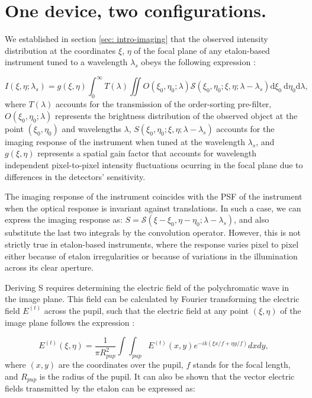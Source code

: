 \section{One device, two configurations.}

We established in section \ref{sec: intro-imaging} that the observed intensity distribution at the coordinates $\xi$, $\eta$ of the focal plane of any etalon-based instrument tuned to a wavelength $\lambda_s$ obeys the following expression \citep{franI}: 

\begin{equation}
    I\left(\xi, \eta ; \lambda_{s}\right)=g(\xi, \eta)\int_{0}^{\infty} T(\lambda) \iint  O\left(\xi_0, \eta_0 ; \lambda\right)  \mathcal{S}\left(\xi_0, \eta_0; \xi , \eta; \lambda-\lambda_{s}\right)  \mathrm{d} \xi_{0} \mathrm{~d} \eta_{0}\mathrm{d} \lambda ,
    \label{eq_etalon_theory: General_Intensity}
\end{equation}
where $T(\lambda)$ accounts for the transmission of the order-sorting pre-filter, $O\left(\xi_0, \eta_0 ; \lambda\right)$ represents the brightness distribution of the observed object at the point $\left(\xi_0, \eta_0\right)$ and wavelengths $\lambda$, $S\left(\xi_0, \eta_0; \xi , \eta; \lambda-\lambda_{s}\right)$ accounts for the imaging response of the instrument when tuned at the wavelength $\lambda_{s}$, and $g(\xi, \eta)$ represents a spatial gain factor that accounts for wavelength independent pixel-to-pixel intensity fluctuations ocurring in the focal plane due to differences in the detectors' sensitivity. 

The imaging response of the instrument coincides with the PSF of the instrument when the optical response is invariant against translations. In such a case, we can express the imaging response as: $S =\mathcal{S}\left(\xi - \xi_0 , \eta - \eta_0; \lambda-\lambda_{s}\right)$, and also substitute the last two integrals by the convolution operator.  However, this is not strictly true in etalon-based instruments, where the response varies pixel to pixel either because of etalon irregularities or because of variations in the illumination across its clear aperture.

Deriving S requires determining the electric field of the polychromatic wave in the image plane. This field can be calculated by Fourier transforming the electric field $E^{(t)}$ across the pupil, such that the electric field at any point $(\xi, \eta)$ of the image plane follows the expression \citep{franI}:

\begin{equation}
  E  ^{(t)}(\xi, \eta) = \frac{1}{\pi R_{pup} ^2} \int \int _ {pup} E^{(t)}(x, y)e ^{-ik( \xi x / f + \eta y / f)}dx dy,
  \label{eq_etalon_theory: electric_image_plane}
\end{equation}
where $(x, y)$ are the coordinates over the pupil, $f$ stands for the focal length, and $R_{pup}$ is the radius of the pupil.  It can also be shown that the vector electric fields transmitted by the etalon can be expressed as:


